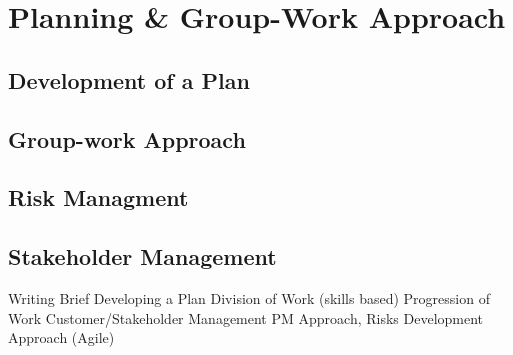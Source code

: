 \section{Planning \& Group-Work Approach}

\subsection{Development of a Plan}


\subsection{Group-work Approach}

\subsection{Risk Managment}

\subsection{Stakeholder Management}

Writing Brief
Developing a Plan
Division of Work (skills based)
Progression of Work
Customer/Stakeholder Management
PM Approach, Risks
Development Approach (Agile)

